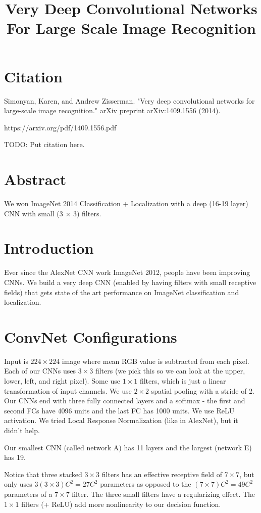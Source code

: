 \documentclass[a4paper]{article}
\title{Very Deep Convolutional Networks For Large Scale Image Recognition}
\date{}
\begin{document}
\maketitle

\section{Citation}

Simonyan, Karen, and Andrew Zisserman. "Very deep convolutional networks for large-scale image recognition." arXiv preprint arXiv:1409.1556 (2014).

https://arxiv.org/pdf/1409.1556.pdf

TODO: Put citation here.

\section{Abstract}
We won ImageNet 2014 Classification + Localization with a deep (16-19 layer)
CNN with small (3 $\times$ 3) filters.

\section{Introduction}
Ever since the AlexNet CNN work ImageNet 2012, people have been improving CNNs.
We build a very deep CNN (enabled by having filters with small receptive fields)
that gets state of the art performance on ImageNet classification and
localization.

\section{ConvNet Configurations}
Input is $224 \times 224$ image where mean RGB value is subtracted from each
pixel. Each of our CNNs uses $3 \times 3$ filters (we pick this so we can look
at the upper, lower, left, and right pixel). Some use $1 \times 1$ filters,
which is just a linear transformation of input channels. We use $2 \times 2$
spatial pooling with a stride of 2. Our CNNs end with three fully connected
layers and a softmax - the first and second FCs have 4096 units and the last FC
has 1000 units. We use ReLU activation. We tried Local Response Normalization
(like in AlexNet), but it didn't help.

Our smallest CNN (called network A) has 11 layers and the largest (network E)
has 19.

Notice that three stacked $3 \times 3$ filters has an effective receptive field
of $7 \times 7$, but only uses $3(3 \times 3)C^2 = 27C^2$ parameters as opposed
to the $(7 \times 7)C^2 = 49C^2$ parameters of a $7 \times 7$ filter. The three
small filters have a regularizing effect. The $1 \times 1$ filters (+ ReLU)
add more nonlinearity to our decision function.
\end{document}
